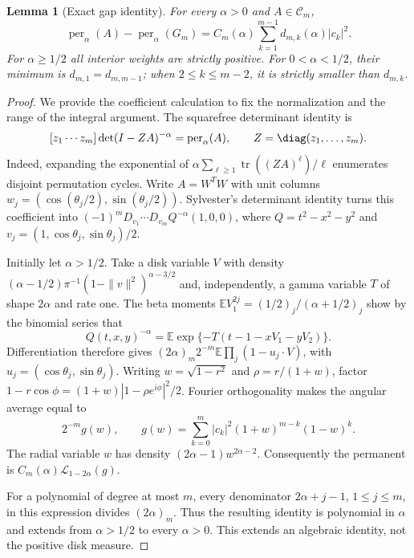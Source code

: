 \documentclass[11pt,a4paper]{article}
\newtheorem{lemma}[theorem]{Lemma}
\theoremstyle{definition}\newtheorem{definition}[theorem]{Definition}
\theoremstyle{remark}\newtheorem{remark}[theorem]{Remark}
\DeclareMathOperator{\tr}{tr}\DeclareMathOperator{\supp}{supp}\DeclareMathOperator{\TV}{TV}
\numberwithin{equation}{section}
\begin{document}
\begin{lemma}[Exact gap identity]
\label{ext-showa-gap}
For every $\alpha>0$ and $A\in\mathcal C_m$,
\begin{equation}\label{ext-showa-gapformula}
 \operatorname{per}_{\alpha}(A)-\operatorname{per}_{\alpha}(G_m)
 =C_m(\alpha)\sum_{k=1}^{m-1}d_{m,k}(\alpha)|c_k|^2.
\end{equation}
For $\alpha\ge1/2$ all interior weights are strictly positive. For
$0<\alpha<1/2$, their minimum is $d_{m,1}=d_{m,m-1}$; when
$2\le k\le m-2$, it is strictly smaller than $d_{m,k}$.
\end{lemma}

\begin{proof}
We provide the coefficient calculation to fix the normalization and the
range of the integral argument. The squarefree determinant identity is
\[
 [z_1\cdots z_m]\det(I-ZA)^{-\alpha}
       =\operatorname{per}_{\alpha}(A),\qquad Z=\diag(z_1,\ldots,z_m).
\]
Indeed, expanding the exponential of
$\alpha\sum_{\ell\ge1}\tr((ZA)^\ell)/\ell$ enumerates disjoint
permutation cycles. Write $A=W^TW$ with unit columns
$w_j=(\cos(\theta_j/2),\sin(\theta_j/2))$. Sylvester's determinant
identity turns this coefficient into
$(-1)^mD_{v_1}\cdots D_{v_m}Q^{-\alpha}(1,0,0)$, where
$Q=t^2-x^2-y^2$ and
$v_j=(1,\cos\theta_j,\sin\theta_j)/2$.

Initially let $\alpha>1/2$. Take a disk variable $V$ with density
$(\alpha-1/2)\pi^{-1}(1-\|v\|^2)^{\alpha-3/2}$ and, independently,
a gamma variable $T$ of shape $2\alpha$ and rate one. The beta moments
$\mathbb E V_1^{2j}=(1/2)_j/(\alpha+1/2)_j$ show by the binomial series
that
\[
 Q(t,x,y)^{-\alpha}
   =\mathbb E\exp\{-T(t-1-xV_1-yV_2)\}.
\]
Differentiation therefore gives
$(2\alpha)_m2^{-m}\mathbb E\prod_j(1-u_j\cdot V)$, with
$u_j=(\cos\theta_j,\sin\theta_j)$.
Writing $w=\sqrt{1-r^2}$ and $\rho=r/(1+w)$, factor
$1-r\cos\phi=(1+w)|1-\rho e^{i\phi}|^2/2$.
Fourier orthogonality makes the angular average equal to
\[
 2^{-m}g(w),\qquad
 g(w)=\sum_{k=0}^m|c_k|^2(1+w)^{m-k}(1-w)^k.
\]
The radial variable $w$ has density $(2\alpha-1)w^{2\alpha-2}$.
Consequently the permanent is $C_m(\alpha)\mathcal L_{1-2\alpha}(g)$.

For a polynomial of degree at most $m$, every denominator
$2\alpha+j-1$, $1\le j\le m$, in this expression divides
$(2\alpha)_m$. Thus the resulting identity is polynomial in $\alpha$
and extends from $\alpha>1/2$ to every $\alpha>0$. This extends an
algebraic identity, not the positive disk measure.


\end{proof}
\end{document}
